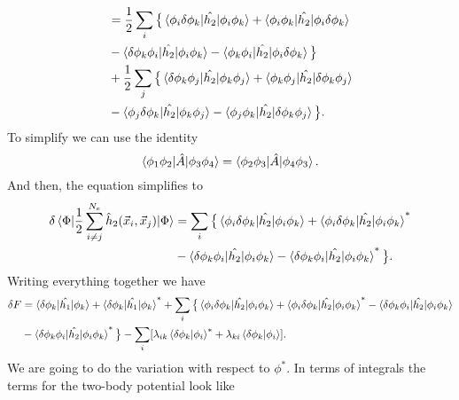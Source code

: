 \begin{questions}
\begin{solution}
\begin{equation}
\begin{aligned}[b]
      &= \frac{1}{2} \sum_i \big\{ \braket{\phi_i \delta\phi_k | \hat{h_2}|\phi_i \phi_k} + \braket{\phi_i \phi_k | \hat{h_2}|\phi_i \delta\phi_k} \\
      & - \braket{\delta\phi_k \phi_i | \hat{h_2}|\phi_i \phi_k} - \braket{\phi_k \phi_i | \hat{h_2}|\phi_i\delta \phi_k}\big\}\\
      &+ \frac{1}{2} \sum_j \big\{ \braket{\delta\phi_k \phi_j | \hat{h_2}|\phi_k \phi_j} + \braket{\phi_k \phi_j | \hat{h_2}|\delta\phi_k \phi_j} \\
      & - \braket{\phi_j \delta\phi_k | \hat{h_2}|\phi_k \phi_j} - \braket{\phi_j \phi_k | \hat{h_2}|\delta\phi_k \phi_j}\big\}.
    \end{aligned}
  \end{equation}
  To simplify we can use the identity
  \begin{equation}
    \braket{\phi_1 \phi_2 |\hat{A}|\phi_3 \phi_4} = \braket{\phi_2 \phi_3 |\hat{A}|\phi_4 \phi_3}.
  \end{equation}
  And then, the equation simplifies to
  \begin{equation}
    \begin{aligned}[b]
      \delta \braket{\Phi|\frac{1}{2}\sum_{i\neq j}^{N_e} \hat{h}_2(\vec{x}_i,\vec{x}_j)|\Phi} &= \sum_i\big\{ \braket{\phi_i \delta\phi_k | \hat{h_2}|\phi_i \phi_k} + \braket{\phi_i \delta \phi_k | \hat{h_2}|\phi_i \phi_k}^* \\
      & - \braket{\delta\phi_k \phi_i | \hat{h_2}|\phi_i \phi_k} - \braket{\delta \phi_k \phi_i | \hat{h_2}|\phi_i \phi_k}^* \big\}.
    \end{aligned}
  \end{equation}
  Writing everything together we have
  \begin{equation}
    \begin{aligned}[b]
      \delta F &= \braket{\delta \phi_k|\hat{h_1}|\phi_k} + \braket{\delta \phi_k|\hat{h_1}|\phi_k}^* + \sum_i\big\{ \braket{\phi_i \delta\phi_k | \hat{h_2}|\phi_i \phi_k} + \braket{\phi_i \delta \phi_k | \hat{h_2}|\phi_i \phi_k}^*  - \braket{\delta\phi_k \phi_i | \hat{h_2}|\phi_i \phi_k} \\
      & - \braket{\delta \phi_k \phi_i | \hat{h_2}|\phi_i \phi_k}^* \big\} - \sum_i [\lambda_{ik} \braket{\delta \phi_k|\phi_i}^* + \lambda_{ki}\braket{\delta \phi_k|\phi_i}].
    \end{aligned}
  \end{equation}
  We are going to do the variation with respect to $\phi^*$. In terms of integrals the terms for the two-body potential look like

\end{solution}
\end{questions}
